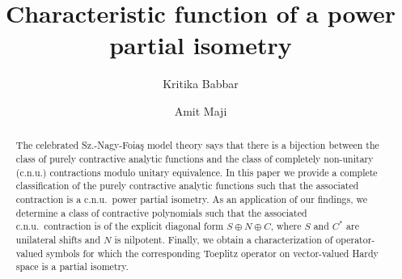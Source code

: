 \documentclass[12pt]{amsart}
\theoremstyle{definition}
\theoremstyle{plain}
\theoremstyle{definition}
\numberwithin{equation}{section}
\begin{document}
\title[Characteristic function of a power partial isometry]{Characteristic function of a power partial isometry}
	
\author[Babbar]{Kritika Babbar}
\address{Indian Institute of Technology Roorkee, Department of Mathematics,
		Roorkee-247 667, Uttarakhand,  India}


\author[Maji]{Amit Maji}
\address{Indian Institute of Technology Roorkee, Department of Mathematics,
		Roorkee-247 667, Uttarakhand,  India}










\begin{abstract}
The celebrated Sz.-Nagy-Foia\c{s} model theory says that there is a bijection between the class of purely contractive analytic functions and the class of completely non-unitary (c.n.u.) contractions modulo unitary equivalence. In this paper we provide a complete classification of the purely contractive analytic functions such that the associated contraction is a c.n.u.\ power partial isometry. As an application of our findings, we determine a class of contractive polynomials such that the associated c.n.u.\ contraction is of the explicit diagonal form $S \oplus N \oplus C$, where $S$ and $C^*$ are unilateral shifts and $N$ is nilpotent. Finally, we obtain a characterization of operator-valued symbols for which the corresponding Toeplitz operator on vector-valued Hardy space is a partial isometry.
\end{abstract}
\maketitle
\end{document}
